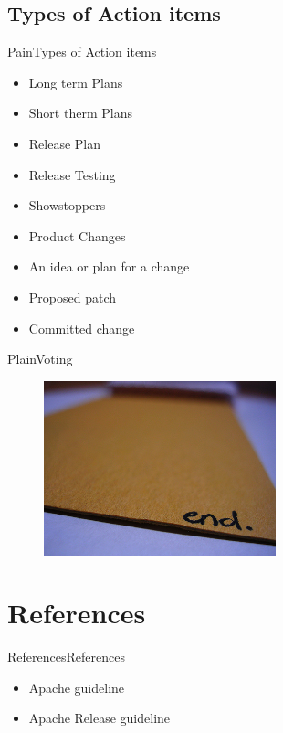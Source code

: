 \documentclass[10pt]{beamer}
\begin{document}
\subsection{Types of Action items}
\begin{frame}{Pain}{Types of Action items}
  \begin{itemize}
    \item Long term Plans
    \item Short therm Plans
    \item Release Plan
    \item Release Testing
    \item Showstoppers
    \item Product Changes
    \item An idea or plan for a change
    \item Proposed patch
    \item Committed change
  \end{itemize}
\end{frame}

\begin{frame}{Plain}{Voting}
  \begin{figure}[ht]
    \centering
    \includegraphics[width=0.6\textwidth, keepaspectratio=true]{images/end.jpg}
  \end{figure}
\end{frame}


\section{References}

\begin{frame}{References}{References}
  \begin{itemize}
    \item Apache guideline
    \item Apache Release guideline
  \end{itemize}
\end{frame}
\end{document}
